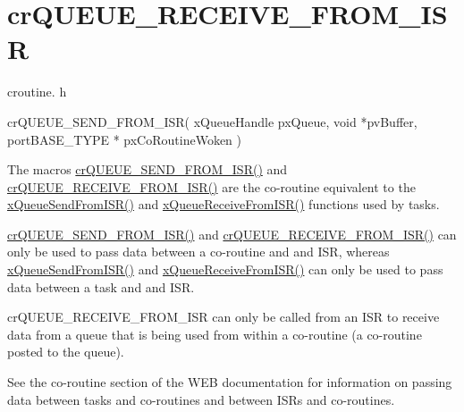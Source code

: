 \hypertarget{group__cr_q_u_e_u_e___r_e_c_e_i_v_e___f_r_o_m___i_s_r}{}\section{cr\+Q\+U\+E\+U\+E\+\_\+\+R\+E\+C\+E\+I\+V\+E\+\_\+\+F\+R\+O\+M\+\_\+\+I\+SR}
\label{group__cr_q_u_e_u_e___r_e_c_e_i_v_e___f_r_o_m___i_s_r}
croutine. h 
\begin{DoxyPre}
 crQUEUE\_SEND\_FROM\_ISR(
                           xQueueHandle pxQueue,
                           void *pvBuffer,
                           portBASE\_TYPE * pxCoRoutineWoken
                      )\end{DoxyPre}


The macro\textquotesingle{}s \mbox{\hyperlink{croutine_8h_ac8eb0a81c5cf69de7e4edd73ce44a3be}{cr\+Q\+U\+E\+U\+E\+\_\+\+S\+E\+N\+D\+\_\+\+F\+R\+O\+M\+\_\+\+I\+S\+R()}} and \mbox{\hyperlink{croutine_8h_a9c0fa977ca69adbddb4811affa2a71f7}{cr\+Q\+U\+E\+U\+E\+\_\+\+R\+E\+C\+E\+I\+V\+E\+\_\+\+F\+R\+O\+M\+\_\+\+I\+S\+R()}} are the co-\/routine equivalent to the \mbox{\hyperlink{queue_8h_a21d5919ed26c21d121df4a4debeb643c}{x\+Queue\+Send\+From\+I\+S\+R()}} and \mbox{\hyperlink{queue_8h_a674c9671220a01ef6b88a9429b1eaf94}{x\+Queue\+Receive\+From\+I\+S\+R()}} functions used by tasks.

\mbox{\hyperlink{croutine_8h_ac8eb0a81c5cf69de7e4edd73ce44a3be}{cr\+Q\+U\+E\+U\+E\+\_\+\+S\+E\+N\+D\+\_\+\+F\+R\+O\+M\+\_\+\+I\+S\+R()}} and \mbox{\hyperlink{croutine_8h_a9c0fa977ca69adbddb4811affa2a71f7}{cr\+Q\+U\+E\+U\+E\+\_\+\+R\+E\+C\+E\+I\+V\+E\+\_\+\+F\+R\+O\+M\+\_\+\+I\+S\+R()}} can only be used to pass data between a co-\/routine and and I\+SR, whereas \mbox{\hyperlink{queue_8h_a21d5919ed26c21d121df4a4debeb643c}{x\+Queue\+Send\+From\+I\+S\+R()}} and \mbox{\hyperlink{queue_8h_a674c9671220a01ef6b88a9429b1eaf94}{x\+Queue\+Receive\+From\+I\+S\+R()}} can only be used to pass data between a task and and I\+SR.

cr\+Q\+U\+E\+U\+E\+\_\+\+R\+E\+C\+E\+I\+V\+E\+\_\+\+F\+R\+O\+M\+\_\+\+I\+SR can only be called from an I\+SR to receive data from a queue that is being used from within a co-\/routine (a co-\/routine posted to the queue).

See the co-\/routine section of the W\+EB documentation for information on passing data between tasks and co-\/routines and between I\+SR\textquotesingle{}s and co-\/routines.


